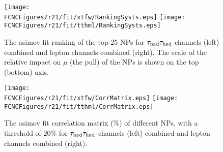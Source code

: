 \begin{figure}[htb]
\centering
\texttt{[image: \\FCNCFigures/r21/fit/xtfw/RankingSysts.eps]}
\texttt{[image: \\FCNCFigures/r21/fit/tthml/RankingSysts.eps]}
\caption{ The asimov fit ranking of the top 25 NPs for $\tau_\text{had}{}\tau_\text{had}$ channels (left) combined and lepton channels combined (right). The scale of the relative impact on $\mu$ (the pull) of the NPs is shown on the top (bottom) axis.}
\label{fig:fcnc_rank_data}
\end{figure}

\begin{figure}[htb]
\centering
\texttt{[image: \\FCNCFigures/r21/fit/xtfw/CorrMatrix.eps]}
\texttt{[image: \\FCNCFigures/r21/fit/tthml/CorrMatrix.eps]}
\caption{ The asimov fit correlation matrix ($\%$) of different NPs, with a threshold of $20\%$ for $\tau_\text{had}{}\tau_\text{had}$ channels (left) combined and lepton channels combined (right). }
\label{fig:fcnc_correl_data}
\end{figure}

